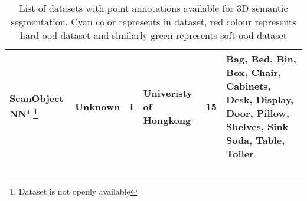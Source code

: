 \documentclass[12pt]{article}
\begin{document}
\begin{longtable}{|o|o|s|o|s|L|}
ScanObject
NN$^{4,}$\footnote{Dataset is not openly available} & Unknown & I & Univeristy of Hongkong & 15 & Bag, Bed, Bin, Box, Chair, Cabinets, Desk, Display, Door, Pillow, Shelves, Sink Soda, Table, Toiler \\ \hline
    \caption{List of datasets with point annotations available for 3D semantic segmentation. Cyan color represents in dataset, red colour represents hard ood dataset and similarly green represents soft ood dataset}
    \label{tab:my_label}
\end{longtable}
\end{document}
